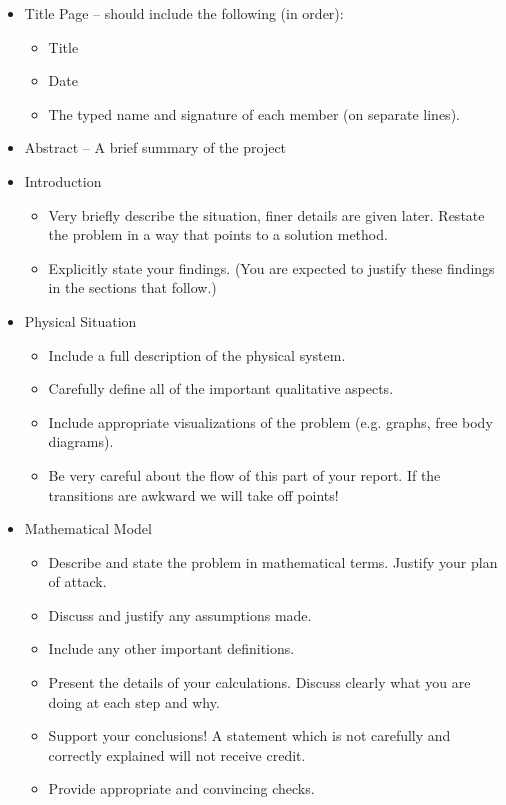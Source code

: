 \begin{itemize}
\item Title Page -- should include the following (in order):
  \begin{itemize}
  \item Title
  \item Date
  \item The typed name and signature of each member (on separate
    lines).
  \end{itemize}
\item Abstract -- A brief summary of the project
\item Introduction
  \begin{itemize}
  \item Very briefly describe the situation, finer details are given
     later.  Restate the problem in a way that points to a solution method.
   \item Explicitly state your findings.  (You are expected to justify
     these findings in the sections that follow.)
  \end{itemize}

\item Physical Situation
  \begin{itemize}
  \item Include a full description of the physical system.
  \item Carefully define all of the important qualitative aspects.
  \item Include appropriate visualizations of the problem (e.g. graphs,
        free body diagrams).
  \item Be very careful about the flow of this part of your report. If
        the transitions are awkward we will take off points!
  \end{itemize}

\item Mathematical Model
  \begin{itemize}
  \item Describe and state the problem in mathematical terms.  Justify
    your plan of attack.
  \item  Discuss and justify any assumptions made.
  \item Include any other important definitions.
  \item  Present the details of your calculations.  Discuss clearly what you
    are doing at each step and why.
  \item Support your conclusions! A statement which is not carefully
    and correctly explained will not receive credit.
  \item Provide appropriate and convincing checks.
  \end{itemize}


\end{itemize}
